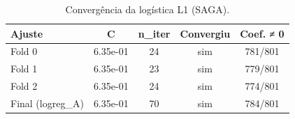 \begin{table}[htbp]
\caption{Convergência da logística L1 (SAGA).}
\label{tab:logconv}
\centering
\small
\begin{tabular}{lcccc}
\toprule
Ajuste & C & n\_iter & Convergiu & Coef. ≠ 0 \\
\midrule
Fold 0 & 6.35e-01 & 24 & sim & 781/801 \\
Fold 1 & 6.35e-01 & 23 & sim & 779/801 \\
Fold 2 & 6.35e-01 & 24 & sim & 774/801 \\
Final (logreg\_A) & 6.35e-01 & 70 & sim & 784/801 \\
\bottomrule
\end{tabular}
\end{table}
